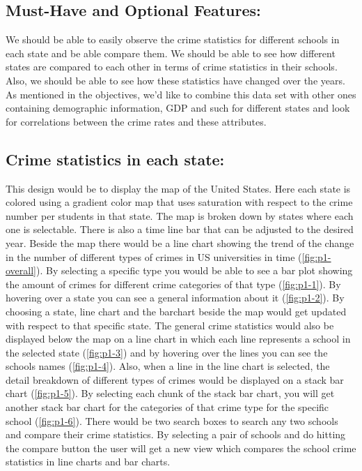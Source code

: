 \documentclass[12pt]{article}
\begin{document}
\subsection{Must-Have and Optional Features:}
We should be able to easily observe the crime statistics for different schools in each state and be able compare them. We should be able to see how different states are compared to each other in terms of crime statistics in their schools. Also, we should be able to see how these statistics have changed over the years.\\
As mentioned in the objectives, we'd like to combine this data set with other ones containing demographic information, GDP and such for different states and look for correlations between the crime rates and these attributes.

\subsection{Crime statistics in each state:} 
This design would be to display the map of the United States. Here each state is colored using a gradient color map that uses saturation with respect to the crime number per students in that state. The map is broken down by states where each one is selectable. There is also a time line bar that can be adjusted to the desired year. Beside the map there would be a line chart showing the trend of the change in the number of different types of crimes in US universities in time (\cref{fig:p1-overall}). By selecting a specific type you would be able to see a bar plot showing the amount of crimes for different crime categories of that type (\cref{fig:p1-1}). By hovering over a state you can see a general information about it (\cref{fig:p1-2}). By choosing a state, line chart and the barchart beside the map would get updated with respect to that specific state. The general crime statistics would also be displayed below the map on a line chart in which each line represents a school in the selected state (\cref{fig:p1-3}) and by hovering over the lines you can see the schools names (\cref{fig:p1-4}). Also, when a line in the line chart is selected, the detail breakdown of different types of crimes would be displayed on a stack bar chart (\cref{fig:p1-5}). By selecting each chunk of the stack bar chart, you will get another stack bar chart for the categories of that crime type for the specific school (\cref{fig:p1-6}). There would be two search boxes to search any two schools and compare their crime statistics. By selecting a pair of schools and do hitting the compare button the user will get a new view which compares the school crime statistics in line charts and bar charts.
\end{document}
